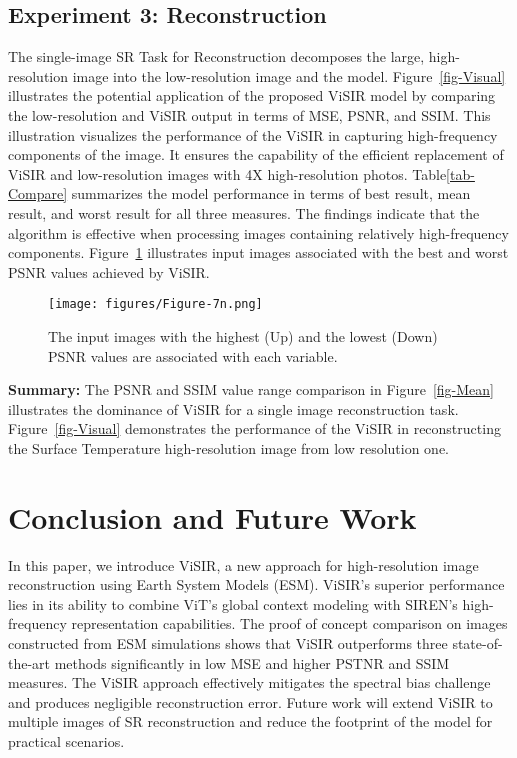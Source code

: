 \documentclass[pdflatex,sn-mathphys-num]{sn-jnl}%
\begin{document}
\subsection{Experiment 3: Reconstruction}

The single-image SR Task for Reconstruction decomposes the large, high-resolution image into the low-resolution image and the model. Figure~\ref{fig-Visual} illustrates the potential application of the proposed ViSIR model by comparing the low-resolution and ViSIR output in terms of MSE, PSNR, and SSIM. This illustration visualizes the performance of the ViSIR in capturing high-frequency components of the image. It ensures the capability of the efficient replacement of ViSIR and low-resolution images with 4X high-resolution photos. Table\ref{tab-Compare} summarizes the model performance in terms of best result, mean result, and worst result for all three measures. The findings indicate that the algorithm is effective when processing images containing relatively high-frequency components. Figure~\ref{fig-Example} illustrates input images associated with the best and worst PSNR values achieved by ViSIR.

\begin{figure}[!ht] 
 \centering
  \centering
  \texttt{[image: figures/Figure-7n.png]}
 \caption{The input images with the highest (Up) and the lowest (Down) PSNR values are associated with each variable.}
 \label{fig-Example}
\end{figure}

\noindent \textbf{Summary:} The PSNR and SSIM value range comparison in Figure~\ref{fig-Mean} illustrates the dominance of ViSIR for a single image reconstruction task. Figure~\ref{fig-Visual} demonstrates the performance of the ViSIR in reconstructing the Surface Temperature high-resolution image from low resolution one. 

\section{Conclusion and Future Work}
\label{sec-conclusion}

In this paper, we introduce ViSIR, a new approach for high-resolution image reconstruction using Earth System Models (ESM). ViSIR's superior performance lies in its ability to combine ViT's global context modeling with SIREN's high-frequency representation capabilities. The proof of concept comparison on images constructed from ESM simulations shows that ViSIR outperforms three state-of-the-art methods significantly in low MSE and higher PSTNR and SSIM measures. The ViSIR approach effectively mitigates the spectral bias challenge and produces negligible reconstruction error. Future work will extend ViSIR to multiple images of SR reconstruction and reduce the footprint of the model for practical scenarios. 



\end{document}
